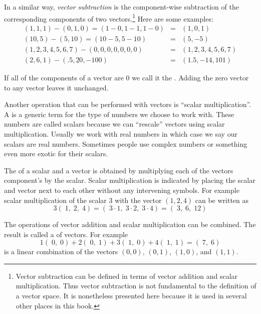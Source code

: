 In a similar way, \emph{vector subtraction} is the component-wise subtraction of the corresponding components of two vectors.\footnote{Vector subtraction can be defined in terms of vector addition and scalar multiplication. Thus vector subtraction is not fundamental to the definition of a vector space. It is nonetheless presented here because it is used in several other places in this book.}  Here are some examples:
\begin{eqnarray*}
(1,1,1) - (0,1,0) = (1-0,1-1,1-0) &=& (1,0,1) \\
(10,5) - (5,10) = (10-5,5-10) &=& (5,-5) \\
(1,2,3,4,5,6,7) - (0,0,0,0,0,0,0) &=& (1,2,3,4,5,6,7) \\
(2,6,1) - (.5,20,-100) &=& (1.5,-14,101)
\end{eqnarray*}

If all of the components of a vector are $0$ we call it the . Adding the zero vector to any vector leaves it unchanged.

  Another operation that can be performed with vectors is ``scalar 
multiplication''. A  is a generic term for the type of
numbers we choose to work with. These numbers are called scalars because we 
can ``rescale'' vectors using scalar multiplication. Usually we work with real 
numbers in which case we say our scalars are real numbers. Sometimes people 
use complex numbers or something even more exotic for their scalars. 

  The  of a scalar and a vector is obtained by 
multiplying each of the vectors component's by the scalar. Scalar 
multiplication is indicated by placing the scalar and vector next to each other 
without any intervening symbols. For example scalar multiplication of the 
scalar $3$ with the vector $( 1, 2, 4)$ can be written as
\begin{equation*}
3(\; 1, \; 2, \; 4) = (\; 3 \cdot 1, \; 3 \cdot 2, \; 3 \cdot 4) 
= (\; 3,\; 6, \; 12)
\end{equation*}

   The operations of vector addition and scalar multiplication can be combined.
The result is called a  of vectors. For example
\begin{equation*}
  1 (\; 0,\; 0) + 2 (\; 0,\; 1) + 3 (\; 1,\; 0) + 4 (\; 1,\; 1) =  (\; 7,\; 6)
\end{equation*}
is a linear combination of the vectors $(0,0)$, $(0,1)$, $(1,0)$, and $(1,1)$.

